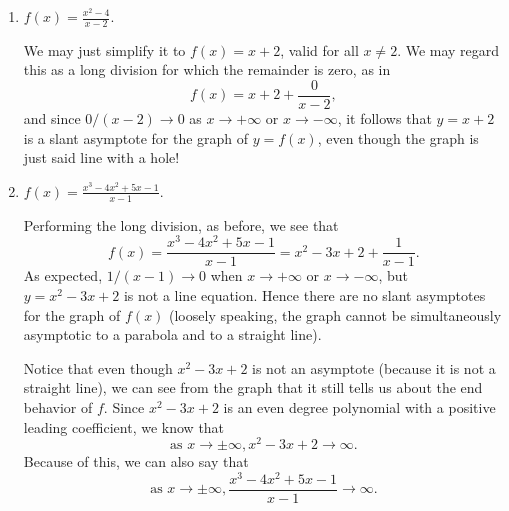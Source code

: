 \documentclass{ximera}
\begin{document}
\begin{example}
\begin{enumerate}
  \item $f(x) = \frac{x^2-4}{x-2}$. \\[1em]
    \begin{explanation}
      We may just simplify it to $f(x) = x+2$, valid for all $x \neq 2$. We may regard this as a long division for which the remainder is zero, as in $$  f(x) = x+2+\frac{0}{x-2},  $$and since $0/(x-2) \to 0$ as $x\to +\infty$ or $x\to -\infty$, it follows that $y=x+2$ is a slant asymptote for the graph of $y=f(x)$, even though the graph is just said line with a hole!
      \begin{image}
      \end{image}      
    \end{explanation}
  \item $f(x)=\frac{x^3-4x^2+5x-1}{x-1}$. \\[1em]
    \begin{explanation}
      Performing the long division, as before, we see that $$   f(x) = \frac{x^3-4x^2+5x-1}{x-1} = x^2-3x+2 + \frac{1}{x-1}.  $$As expected, $1/(x-1) \to 0$ when $x \to +\infty$ or $x\to -\infty$, but $y=x^2-3x+2$ is not a line equation. Hence there are no slant asymptotes for the graph of $f(x)$ (loosely speaking, the graph cannot be simultaneously asymptotic to a parabola and to a straight line).
      \begin{image}
      \end{image}
    \end{explanation}
Notice that even though $x^2-3x+2$ is not an asymptote (because it is not a straight line), we can see from the graph that it still tells us about the end behavior of $f$.  Since $x^2-3x+2$ is an even degree polynomial with a positive leading coefficient, we know that 
\[
\text{as } x \rightarrow \pm \infty, x^2-3x+2 \rightarrow \infty.
\]
 Because of this, we can also say that 
\[
\text{as } x \rightarrow \pm \infty, \frac{x^3-4x^2+5x-1}{x-1} \rightarrow \infty.
\]


\end{enumerate}
\end{example}
\end{document}
